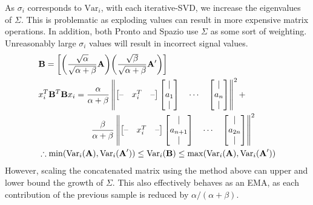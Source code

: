 As $\sigma_i$ corresponds to $\text{Var}_i$, with each iterative-SVD, we
increase the eigenvalues of $\Sigma$. This is problematic as exploding values
can result in more expensive matrix operations. In addition, both Pronto and
Spazio use $\Sigma$ as some sort of weighting. Unreasonably large $\sigma_i$
values will result in incorrect signal values.
\begin{align}
    & \textbf{B} = \left[\bigg(\frac{\sqrt{\alpha}}{\sqrt{\alpha +
    \beta}}\mathbf{A}\bigg)\bigg(\frac{\sqrt{\beta}}{\sqrt{\alpha +
    \beta}}\mathbf{A'}\bigg)\right] \\
& x_i^T \mathbf{B}^T\mathbf{B} x_i = \frac{\alpha}{\alpha + \beta}\left\| \begin{bmatrix}
\text{--} & x_i^T & \text{--} \\
\end{bmatrix}
\begin{bmatrix}
| \\
a_1 \\
|
\end{bmatrix} \quad \cdots \quad
\begin{bmatrix}
| \\
a_{n} \\
|
\end{bmatrix} \right\|^2 + \\
& \hspace{2.2cm} \frac{\beta}{\alpha + \beta}\left\| \begin{bmatrix}
\text{--} & x_i^T & \text{--} \\
\end{bmatrix}
\begin{bmatrix}
| \\
a_{n+1} \\
|
\end{bmatrix} \quad \cdots \quad
\begin{bmatrix}
| \\
a_{2n} \\
|
\end{bmatrix} \right\|^2\\
    &\therefore \min(\text{Var}_i(\textbf{A}), \text{Var}_i(\textbf{A}')) \leq
    \text{Var}_i(\textbf{B}) \leq \max(\text{Var}_i(\textbf{A}),
    \text{Var}_i(\textbf{A}'))
\end{align}
However, scaling the concatenated matrix using the method above can upper
and lower bound the growth of $\Sigma$. This also effectively behaves as an EMA,
as each contribution of the previous sample is reduced by $\alpha / (\alpha +
\beta)$.

